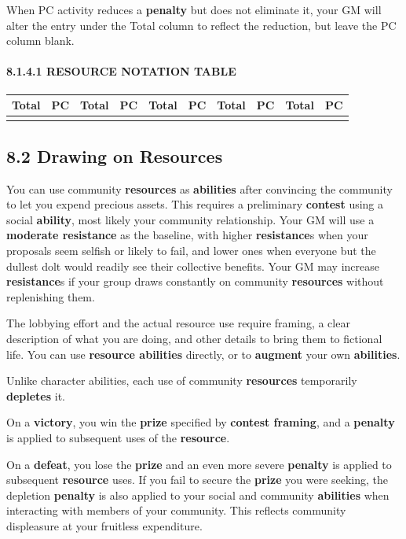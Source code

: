 \documentclass[
]{article}
\begin{document}
When PC activity reduces a \textbf{penalty} but does not eliminate it,
your GM will alter the entry under the Total column to reflect the
reduction, but leave the PC column blank.

\hypertarget{resource-notation-table}{%
\paragraph{8.1.4.1 RESOURCE NOTATION
TABLE}\label{resource-notation-table}}

\begin{longtable}[]{@{}llllllllll@{}}
\toprule
Total & PC & Total & PC & Total & PC & Total & PC & Total &
PC\tabularnewline
\midrule
\endhead
& & & & & & & & &\tabularnewline
\bottomrule
\end{longtable}

\hypertarget{drawing-on-resources}{%
\subsection{8.2 Drawing on Resources}\label{drawing-on-resources}}

You can use community \textbf{resources} as \textbf{abilities} after
convincing the community to let you expend precious assets. This
requires a preliminary \textbf{contest} using a social \textbf{ability},
most likely your community relationship. Your GM will use a
\textbf{moderate resistance} as the baseline, with higher
\textbf{resistance}s when your proposals seem selfish or likely to fail,
and lower ones when everyone but the dullest dolt would readily see
their collective benefits. Your GM may increase \textbf{resistance}s if
your group draws constantly on community \textbf{resources} without
replenishing them.

The lobbying effort and the actual resource use require framing, a clear
description of what you are doing, and other details to bring them to
fictional life. You can use \textbf{resource abilities} directly, or to
\textbf{augment} your own \textbf{abilities}.

Unlike character abilities, each use of community \textbf{resources}
temporarily \textbf{depletes} it.

On a \textbf{victory}, you win the \textbf{prize} specified by
\textbf{contest framing}, and a \textbf{penalty} is applied to
subsequent uses of the \textbf{resource}.

On a \textbf{defeat}, you lose the \textbf{prize} and an even more
severe \textbf{penalty} is applied to subsequent \textbf{resource} uses.
If you fail to secure the \textbf{prize} you were seeking, the depletion
\textbf{penalty} is also applied to your social and community
\textbf{abilities} when interacting with members of your community. This
reflects community displeasure at your fruitless expenditure.
\end{document}
